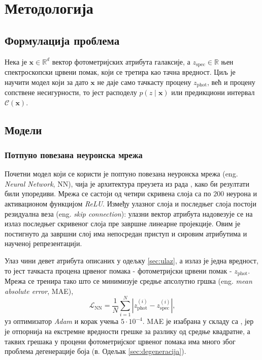 \documentclass[12pt,oneside]{memoir}
\newcommand{\zspec}{z_{\mathrm{spec}}}
\newcommand{\zphot}{z_{\mathrm{phot}}}
\newcommand{\bm}[1]{\mathbf{#1}}
\newcommand{\predset}{\mathcal{C}}
\newcommand{\NN}{\mathrm{NN}}
\begin{document}
\chapter{Методологија}
\label{ch:methodology}

\section{Формулација проблема}

Нека је $\bm{x} \in \mathbb{R}^d$ вектор фотометријских атрибута галаксије,
а $\zspec \in \mathbb{R}$ њен спектроскопски црвени помак, који се третира као тачна
вредност. Циљ је научити модел који за дато $\bm{x}$ не даје само тачкасту процену $\zphot$,
већ и процену сопствене несигурности, то јест расподелу $p(z \mid \bm{x})$ или 
предикциони интервал $\predset(\bm{x})$.


\section{Модели}
\subsection{Потпуно повезана неуронска мрежа}
\label{subsec:nn}

Почетни модел који се користи је поптуно повезана неуронска мрежа (eng. \textit{Neural Network}, NN), чија је архитектура
преузета из рада \cite{jones2024a}, како би резултати били упоредиви. Мрежа се састоји од четири 
скривена слоја са по $200$ неурона и активационом функцијом \textit{ReLU}. Између улазног слоја и 
последњег слоја постоји резидуална веза (eng. \textit{skip connection}): улазни вектор атрибута 
надовезује се на излаз последњег скривеног слоја пре завршне линеарне пројекције. Овим је постигнуто 
да завршни слој има непосредан приступ и сировим атрибутима и наученој репрезентацији.

Улаз чини девет атрибута описаних у одељку \ref{sec:ulaz}, а излаз је једна вредност, то јест 
тачкаста процена црвеног помака - фотометријски црвени помак - $\zphot$. 
Мрежа се тренира тако што се минимизује средње апсолутно гршка (eng. \textit{mean absolute error}, MAE),
%
\begin{equation}
  \mathcal{L}_{\NN} = \frac{1}{N} \sum_{i=1}^{N}
  \left| \zphot^{(i)} - \zspec^{(i)} \right| ,
  \label{eq:nn-loss}
\end{equation}
%
уз оптимизатор \textit{Adam} и корак учења $5 \cdot 10^{-4}$. MAE је изабрана у складу са \cite{jones2024a}, 
јер је отпорнија на екстремне вредности грешке за разлику од средње квадратне, а таквих грешака у процени 
фотометријског црвеног помака има много због проблема дегенерације боја (в. Одељак \ref{sec:degeneracija}).
\end{document}
